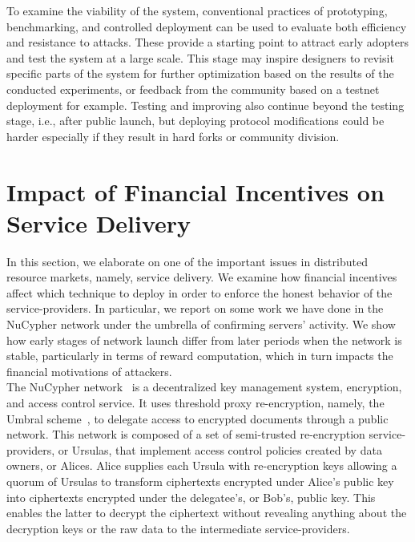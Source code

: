 \documentclass{llncs}
\begin{document}
\vspace{-4pt}
 To examine the viability of the system, conventional practices of prototyping, benchmarking, and controlled deployment can be used to evaluate both efficiency and resistance to attacks. These provide a starting point to attract early adopters and test the system at a large scale. This stage may inspire designers to revisit specific parts of the system for further optimization based on the results of the conducted experiments, or feedback from the community based on a testnet deployment for example. Testing and improving also continue beyond the testing stage, i.e., after public launch, but deploying protocol modifications could be harder especially if they result in hard forks or community division.


\section{Impact of Financial Incentives on Service Delivery}
In this section, we elaborate on one of the important issues in distributed resource markets, namely, service delivery. We examine how financial incentives affect which technique to deploy in order to enforce the honest behavior of the service-providers. In particular, we report on some work we have done in the NuCypher network under the umbrella of confirming servers' activity. We show how early stages of network launch differ from later periods when the network is stable, particularly in terms of reward computation, which in turn impacts the financial motivations of attackers.  \\

  
 The NuCypher network~\cite{nucypher,egorov2017nucypher} is a decentralized key management 
system, encryption, and access control service. It uses threshold proxy re-encryption, namely, the 
Umbral scheme~\cite{umbral2018}, to delegate access to encrypted 
documents through a public network. This network is composed of a set of semi-trusted 
re-encryption service-providers, or Ursulas, that implement access control policies created by data 
owners, or Alices. Alice supplies each Ursula with re-encryption keys allowing a quorum of Ursulas to transform 
ciphertexts encrypted under Alice's public key into ciphertexts encrypted under the delegatee's, or Bob's,
public key. This enables the latter to decrypt the ciphertext without revealing anything about the
decryption keys or the raw data to the intermediate service-providers. 
\end{document}
